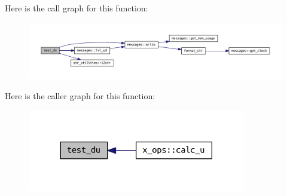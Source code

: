 Here is the call graph for this function\+:
\nopagebreak
\begin{figure}[H]
\begin{center}
\leavevmode
\includegraphics[width=350pt]{X__ops_8f90_a60ad682c469a085ff3f744ce3191940f_cgraph}
\end{center}
\end{figure}
Here is the caller graph for this function\+:
\nopagebreak
\begin{figure}[H]
\begin{center}
\leavevmode
\includegraphics[width=270pt]{X__ops_8f90_a60ad682c469a085ff3f744ce3191940f_icgraph}
\end{center}
\end{figure}
